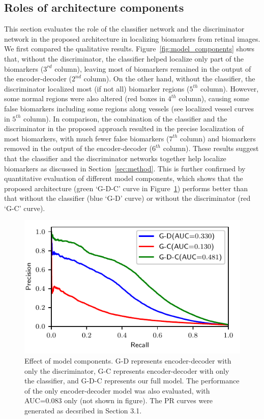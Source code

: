 \documentclass[runningheads]{llncs}
\begin{document}
\subsection{Roles of architecture components}\label{subsec:roles_of_architecture_components}
This section evaluates the role of the classifier network and the discriminator network in the proposed architecture in localizing biomarkers from retinal images. We first compared the qualitative results. Figure~\ref{fig:model_components} shows that, without the discriminator, the classifier helped localize only part of the biomarkers ($3^{rd}$ column), leaving most of biomarkers remained in the output of the encoder-decoder ($2^{nd}$ column). On the other hand, without the classifier, the discriminator localized most (if not all) biomarker regions ($5^{th}$ column). However, some normal regions were also altered (red boxes in $4^{th}$ column), causing some false biomarkers including some regions along vessels (see localized vessel curves in $5^{th}$ column). In comparison, the combination of the classifier and the discriminator in the proposed approach resulted in the precise localization of most biomarkers, with much fewer false biomarkers ($7^{th}$ column) and biomarkers removed in the output of the encoder-decoder ($6^{th}$ column).  These results suggest that the classifier and the discriminator networks together help localize biomarkers as discussed in Section~\ref{sec:method}. This is further confirmed by quantitative evaluation of different model components, which shows that the proposed architecture (green `G-D-C' curve in Figure~\ref{fig:model_components_auc}) performs better than that without the classifier (blue `G-D' curve) or without the discriminator (red `G-C' curve). 

\begin{figure}%
	\centering
	\includegraphics[width=.6\textwidth]{images/u_d_u_c_u_d_c_components}  
	\caption{Effect of model components. G-D represents encoder-decoder with only the discriminator, G-C represents encoder-decoder with only the classifier, and G-D-C represents our full model. The performance of the only encoder-decoder model was also evaluated, with AUC=0.083 only (not shown in figure). The PR curves were generated as decsribed in Section 3.1.
	} \label{fig:model_components_auc}
	\vspace{-0.5cm}
\end{figure}
\end{document}
